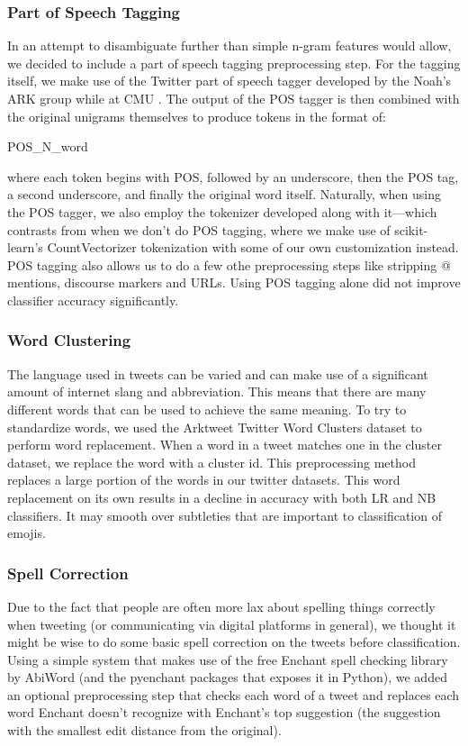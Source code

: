 \documentclass[11pt]{article}
\begin{document}
\subsubsection{Part of Speech Tagging}
In an attempt to disambiguate further than simple n-gram features would allow, we decided to include a part of speech tagging preprocessing step. For the tagging itself, we make use of the Twitter part of speech tagger developed by the Noah's ARK group while at CMU \cite{owoputi2013improved}. The output of the POS tagger is then combined with the original unigrams themselves to produce tokens in the format of:
\begin{center}
POS\_N\_word
\end{center}
where each token begins with POS, followed by an underscore, then the POS tag, a second underscore, and finally the original word itself. Naturally, when using the POS tagger, we also employ the tokenizer developed along with it—which contrasts from when we don't do POS tagging, where we make use of scikit-learn's CountVectorizer tokenization with some of our own customization instead. POS tagging also allows us to do a few othe preprocessing steps like stripping @ mentions, discourse markers and URLs. Using POS tagging alone did not improve classifier accuracy significantly.

\subsubsection{Word Clustering}
The language used in tweets can be varied and can make use of a significant amount of internet slang and abbreviation. This means that there are many different words that can be used to achieve the same meaning. To try to standardize words, we used the Arktweet Twitter Word Clusters dataset to perform word replacement. When a word in a tweet matches one in the cluster dataset, we replace the word with a cluster id. This preprocessing method replaces a large portion of the words in our twitter datasets. This word replacement on its own results in a decline in accuracy with both LR and NB classifiers. It may smooth over subtleties that are important to classification of emojis.

\subsubsection{Spell Correction}
Due to the fact that people are often more lax about spelling things correctly when tweeting (or communicating via digital platforms in general), we thought it might be wise to do some basic spell correction on the tweets before classification. Using a simple system that makes use of the free Enchant spell checking library by AbiWord (and the pyenchant packages that exposes it in Python), we added an optional preprocessing step that checks each word of a tweet and replaces each word Enchant doesn't recognize with Enchant's top suggestion (the suggestion with the smallest edit distance from the original).
\end{document}
